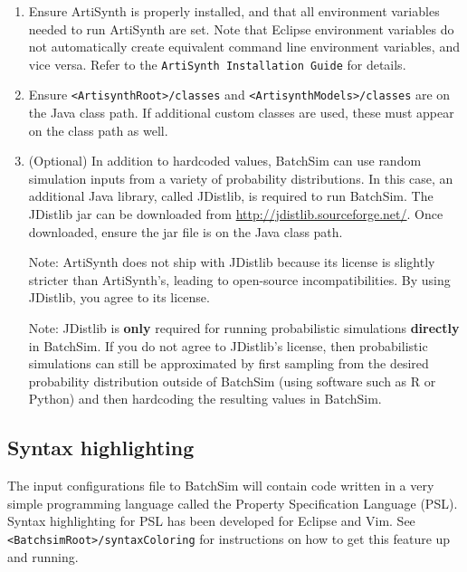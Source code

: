 \documentclass{article}
\newcommand{\AS}{<ArtisynthRoot>}
\newcommand{\AM}{<ArtisynthModels>}
\newcommand{\BS}{<BatchsimRoot>}
\begin{document}
\begin{enumerate}

\item Ensure ArtiSynth is properly installed, and that all environment variables needed to run ArtiSynth are set. Note that Eclipse environment variables do not automatically create equivalent command line environment variables, and vice versa. Refer to the {\tt ArtiSynth Installation Guide} for details.

\item Ensure {\tt \AS/classes} and {\tt \AM/classes} are on the Java class path. If additional custom classes are used, these must appear on the class path as well.

\item (Optional) In addition to hardcoded values, BatchSim can use random simulation inputs from a variety of probability distributions. In this case, an additional Java library, called JDistlib, is required to run BatchSim. The JDistlib jar can be downloaded from \href{http://jdistlib.sourceforge.net/}{http://jdistlib.sourceforge.net/}. Once downloaded, ensure the jar file is on the Java class path.

\begin{sideblock}
Note: ArtiSynth does not ship with JDistlib because its license is slightly stricter than ArtiSynth's, leading to open-source incompatibilities. By using JDistlib, you agree to its license.
\end{sideblock}

\begin{sideblock}
Note: JDistlib is \textbf{only} required for running probabilistic simulations \textbf{directly} in BatchSim. If you do not agree to JDistlib's license, then probabilistic simulations can still be approximated by first sampling from the desired probability distribution outside of BatchSim (using software such as R or Python) and then hardcoding the resulting values in BatchSim.
\end{sideblock}

\end{enumerate}

\subsection{Syntax highlighting}

The input configurations file to BatchSim will contain code written in a very simple programming language called the Property Specification Language (PSL). Syntax highlighting for PSL has been developed for Eclipse and Vim. See {\tt \BS/syntaxColoring} for instructions on how to get this feature up and running.
\end{document}
